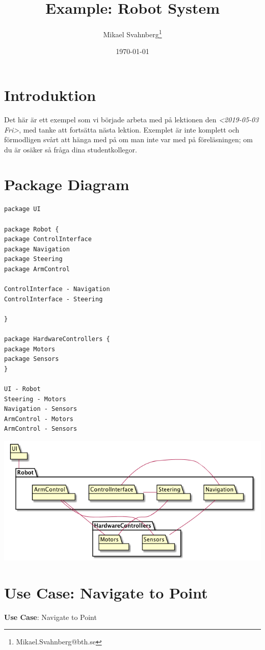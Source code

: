 \documentclass[10pt,a4paper]{article}
\author{Mikael Svahnberg\thanks{Mikael.Svahnberg@bth.se}}
\date{\today}
\title{Example: Robot System}
\begin{document}
\maketitle
\tableofcontents


\section{Introduktion}
\label{sec:orgbdc108a}
Det här är ett exempel som vi började arbeta med på lektionen den \textit{<2019-05-03 Fri>}, med tanke att fortsätta nästa lektion. Exemplet är inte komplett och förmodligen svårt att hänga med på om man inte var med på föreläsningen; om du är osäker så fråga dina studentkollegor.
\section{Package Diagram}
\label{sec:org11d7a63}
\begin{verbatim}
package UI

package Robot {
package ControlInterface
package Navigation
package Steering
package ArmControl

ControlInterface - Navigation
ControlInterface - Steering

}

package HardwareControllers {
package Motors
package Sensors
}

UI - Robot
Steering - Motors
Navigation - Sensors
ArmControl - Motors
ArmControl - Sensors

\end{verbatim}

\begin{center}
\includegraphics[width=.9\linewidth]{packdia.jpg}
\end{center}

\section{Use Case: Navigate to Point}
\label{sec:orgd6f0d3e}
\textbf{Use Case}: Navigate to Point
\end{document}
